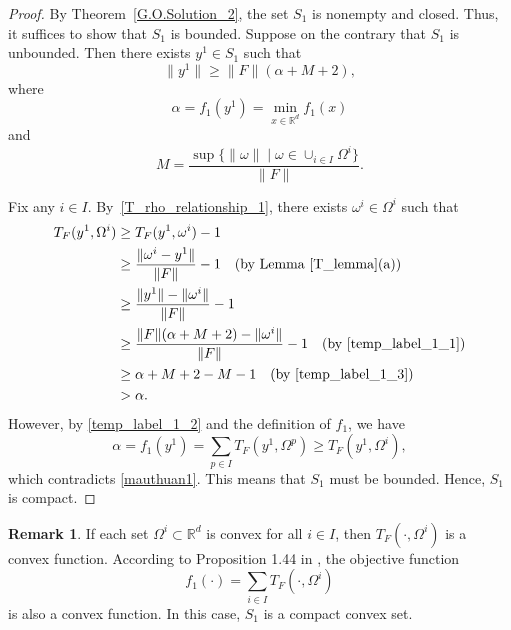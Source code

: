 \documentclass[sn-mathphys-num]{sn-jnl}%
\theoremstyle{definition}
\newtheorem{remark}[theorem]{Remark}
\begin{document}
\begin{proof}
	By Theorem~\ref{G.O.Solution_2}, the set $S_1$ is nonempty and closed. 
	Thus, it suffices to show that $S_1$ is bounded.
	Suppose on the contrary that $S_1$ is unbounded. 
	Then there exists $y^1\in S_1$ such that
	\begin{equation}
		\label{temp_label_1_1}
		\|y^1\| \ge \|F\|(\alpha+M+2),
	\end{equation}
	where
	\begin{equation}
		\label{temp_label_1_2}
		\alpha = f_1(y^1)=\min_{x\in\mathbb{R}^d} f_1(x)
	\end{equation}
	and
	\begin{equation}
		\label{temp_label_1_3}
		M=\frac{\sup\{\|\omega\|\mid \omega\in\cup_{i\in I}\Omega^i\}}{\|F\|}.
	\end{equation}
	
	Fix any $i\in I$. By~\eqref{T_rho_relationship_1}, there exists 
	$\omega^i\in\Omega^i$ such that
	\begin{equation}
		\begin{aligned}
			\label{mauthuan1}
			T_F(y^1,\Omega^i)
			&\ge T_F(y^1,\omega^i)-1 \\
			&\ge \frac{\|\omega^i-y^1\|}{\|F\|}-1 
			\quad (\text{by Lemma~\ref{T_lemma}(a)})\\
			&\ge \frac{\|y^1\|-\|\omega^i\|}{\|F\|}-1 \\
			&\ge \frac{\|F\|(\alpha+M+2)-\|\omega^i\|}{\|F\|}-1 
			\quad (\text{by \eqref{temp_label_1_1}})\\
			&\ge \alpha+M+2-M-1
			\quad (\text{by \eqref{temp_label_1_3}})\\
			&>\alpha .
		\end{aligned}
	\end{equation}
	However, by \eqref{temp_label_1_2} and the definition of $f_1$, we have
	\[
	\alpha = f_1(y^1) = \sum_{p \in I} T_F(y^1, \Omega^p) \geq T_F(y^1, \Omega^i),
	\]
	which contradicts \eqref{mauthuan1}.
	This means that $S_1$ must be bounded. Hence, $S_1$ is compact.
\end{proof}
\begin{remark}
	If each set $\Omega^i \subset \mathbb{R}^d$ is convex for all $i \in I$, then $T_F(\cdot,\Omega^i)$ is a convex function. According to Proposition 1.44 in \cite{mordukhovich2023easy}, the objective function
	\[ 
	f_1(\cdot)=\sum_{i \in I} T_F(\cdot,\Omega^i)
	\]
	is also a convex function. In this case, $S_1$ is a compact convex set.
\end{remark}
\end{document}
